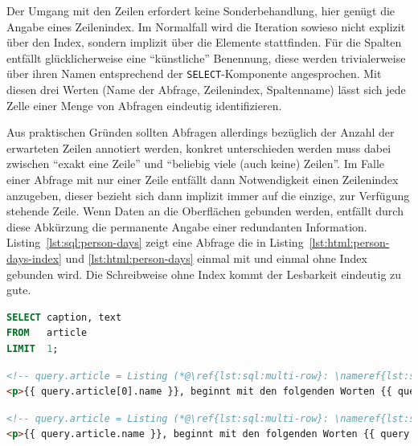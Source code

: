 Der Umgang mit den Zeilen erfordert keine Sonderbehandlung, hier genügt die Angabe eines Zeilenindex. Im Normalfall wird die Iteration sowieso nicht explizit über den Index, sondern implizit über die Elemente stattfinden. Für die Spalten entfällt glücklicherweise eine "`künstliche"' Benennung, diese werden trivialerweise über ihren Namen entsprechend der \texttt{SELECT}-Komponente angesprochen. Mit diesen drei Werten (Name der Abfrage, Zeilenindex, Spaltenname) lässt sich jede Zelle einer Menge von Abfragen eindeutig identifizieren.

Aus praktischen Gründen sollten Abfragen allerdings bezüglich der Anzahl der erwarteten Zeilen annotiert werden, konkret unterschieden werden muss dabei zwischen "`exakt eine Zeile"' und "`beliebig viele (auch keine) Zeilen"'. Im Falle einer Abfrage mit nur einer Zeile entfällt dann Notwendigkeit einen Zeilenindex anzugeben, dieser bezieht sich dann implizit immer auf die einzige, zur Verfügung stehende Zeile. Wenn Daten an die Oberflächen gebunden werden, entfällt durch diese Abkürzung die permanente Angabe einer redundanten Information. Listing~\ref{lst:sql:person-days} zeigt eine Abfrage die in Listing~\ref{lst:html:person-days-index} und \ref{lst:html:person-days} einmal mit und einmal ohne Index gebunden wird. Die Schreibweise ohne Index kommt der Lesbarkeit eindeutig zu gute.

\begin{lstlisting}[float=h, language=SQL, caption=Abfrage mit maximal einer Ergebniszeile,label=lst:sql:multi-row]
SELECT caption, text
FROM   article
LIMIT  1;
\end{lstlisting}

\begin{lstlisting}[float=h, language=HTML, caption=String-Interpolation mit Indexzugriff, label=lst:html:person-days-index]
<!-- query.article = Listing (*@\ref{lst:sql:multi-row}: \nameref{lst:sql:multi-row}@*) -->
<p>{{ query.article[0].name }}, beginnt mit den folgenden Worten {{ query.article[0].text | truncatewords: 4 }}.</p>
\end{lstlisting}

\begin{lstlisting}[float=h, language=HTML, caption=String-Interpolation mit implizitem Index, label=lst:html:person-days-index]
<!-- query.article = Listing (*@\ref{lst:sql:multi-row}: \nameref{lst:sql:multi-row}@*) -->
<p>{{ query.article.name }}, beginnt mit den folgenden Worten {{ query.article.text | truncatewords: 4 }}.</p>
\end{lstlisting}


